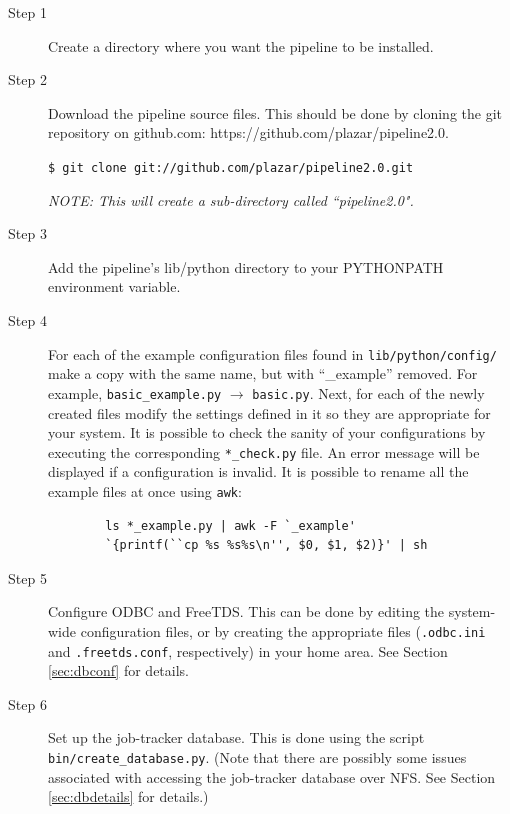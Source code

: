 \documentclass[12pt]{article}
\begin{document}
\begin{description}
    \item[Step 1] Create a directory where you want the pipeline to be installed.

    \item[Step 2] Download the pipeline source files. This should be done by cloning the git repository on github.com: https://github.com/plazar/pipeline2.0.

        \smallskip

        \texttt{\$ git clone git://github.com/plazar/pipeline2.0.git}

        \smallskip
        
        \textit{NOTE: This will create a sub-directory called ``pipeline2.0".} 

    \item[Step 3] Add the pipeline's lib/python directory to your PYTHONPATH environment variable. 

    \item[Step 4] For each of the example configuration files found in \texttt{lib/python/config/} make a copy with the same name, but with ``\_example'' removed. For example, \texttt{basic\_example.py} $\rightarrow$ \texttt{basic.py}. Next, for each of the newly created files modify the settings defined in it so they are appropriate for your system. It is possible to check the sanity of your configurations by executing the corresponding \texttt{*\_check.py} file. An error message will be displayed if a configuration is invalid. It is possible to rename all the example files at once using \texttt{awk}:

    \begin{verbatim}
        ls *_example.py | awk -F `_example' 
        `{printf(``cp %s %s%s\n'', $0, $1, $2)}' | sh
    \end{verbatim}

    \item[Step 5] Configure ODBC and FreeTDS. This can be done by editing the system-wide configuration files, or by creating the appropriate files (\texttt{.odbc.ini} and \texttt{.freetds.conf}, respectively) in your home area. See Section \ref{sec:dbconf} for details.

    \item[Step 6] Set up the job-tracker database. This is done using the script \texttt{bin/create\_database.py}. (Note that there are possibly some issues associated with accessing the job-tracker database over NFS. See Section \ref{sec:dbdetails} for details.)


\end{description}
\end{document}
